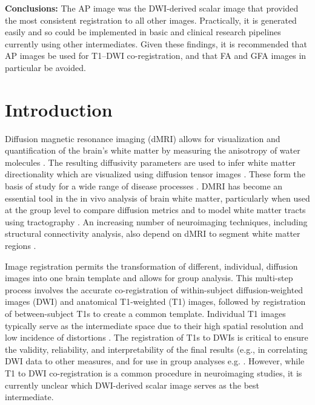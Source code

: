 \textbf{Conclusions:} The AP image was the DWI-derived scalar image that provided the most consistent registration to all other images. Practically, it is generated easily and so could be implemented in basic and clinical research pipelines currently using other intermediates. Given these findings, it is recommended that AP images be used for T1–DWI co-registration, and that FA and GFA images in particular be avoided.

\section{Introduction}

Diffusion magnetic resonance imaging (dMRI) allows for visualization and quantification of the brain’s white matter by measuring the anisotropy of water molecules \cite{Lenglet2009f}. The resulting diffusivity parameters are used to infer white matter directionality which are visualized using diffusion tensor images \cite{Basser2002}. These form the basis of study for a wide range of disease processes \cite{Chen2016a,Ciccarelli2008,Hodaie2012g}. DMRI has become an essential tool in the in vivo analysis of brain white matter, particularly when used at the group level \cite{Chen2016} to compare diffusion metrics and to model white matter tracts using tractography \cite{Chen2016,Chen2015c,Hodaie2010}. An increasing number of neuroimaging techniques, including structural connectivity analysis, also depend on dMRI to segment white matter regions \cite{Moayedi2012a,McGrath2013,Wiech2014}. 

Image registration permits the transformation of different, individual, diffusion images into one brain template and allows for group analysis. This multi-step process involves the accurate co-registration of within-subject diffusion-weighted images (DWI) and anatomical T1-weighted (T1) images, followed by registration of between-subject T1s to create a common template. Individual T1 images typically serve as the intermediate space due to their high spatial resolution and low incidence of distortions \cite{Avants2009,Brown1992,Klein2009,Tustison2014}. The registration of T1s to DWIs is critical to ensure the validity, reliability, and interpretability of the final results (e.g., in correlating DWI data to other measures, and for use in group analyses e.g. \cite{Chen2016}. However, while T1 to DWI co-registration is a common procedure in neuroimaging studies, it is currently unclear which DWI-derived scalar image serves as the best intermediate. 

